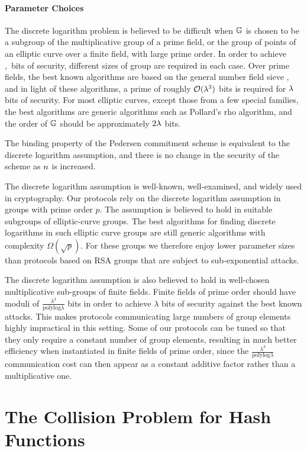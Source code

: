 \paragraph{Parameter Choices} The discrete logarithm problem is believed to be difficult when $\mathbb{G}$ is chosen to be a subgroup of the multiplicative group of a prime field, or the group of points of an elliptic curve over a finite field, with large prime order. In order to achieve \sep\ bits of security, different sizes of group are required in each case. Over prime fields, the best known algorithms are based on the general number field sieve \cite{schiro}, and in light of these algorithms, a prime of roughly $\mathcal{O}(\lambda^3)$ bits is required for $\lambda$ bits of security. For most elliptic curves, except those from a few special families, the best algorithms are generic algorithms such as Pollard's rho algorithm, and the order of $\mathbb{G}$ should be approximately $2\lambda$ bits.

The binding property of the Pedersen commitment scheme is equivalent to the discrete logarithm assumption, and there is no change in the security of the scheme as $n$ is increased.

The discrete logarithm assumption is well-known, well-examined, and widely used in cryptography. Our protocols rely on the discrete logarithm assumption in groups with prime order $p$. The assumption is believed to hold in suitable subgroups of elliptic-curve groups. The best algorithms for finding discrete logarithms in such elliptic curve groups are still generic algorithms with complexity $\Omega (\sqrt{p})$. For these groups we therefore enjoy lower parameter sizes than protocols based on RSA groups that are subject to sub-exponential attacks.

The discrete logarithm assumption is also believed to hold in well-chosen multiplicative sub-groups of finite fields. Finite fields of prime order should have moduli of $\frac{\lambda^3}{\mathrm{polylog}\lambda}$ bits in order to achieve $\lambda$ bits of security against the best known attacks. This makes protocols communicating large numbers of group elements highly impractical in this setting. Some of our protocols can be tuned so that they only require a constant number of group elements, resulting in much better efficiency when instantiated in finite fields of prime order, since the $\frac{\lambda^3}{\mathrm{polylog}\lambda}$ communication cost can then appear as a constant additive factor rather than a multiplicative one.

\section{The Collision Problem for Hash Functions}

